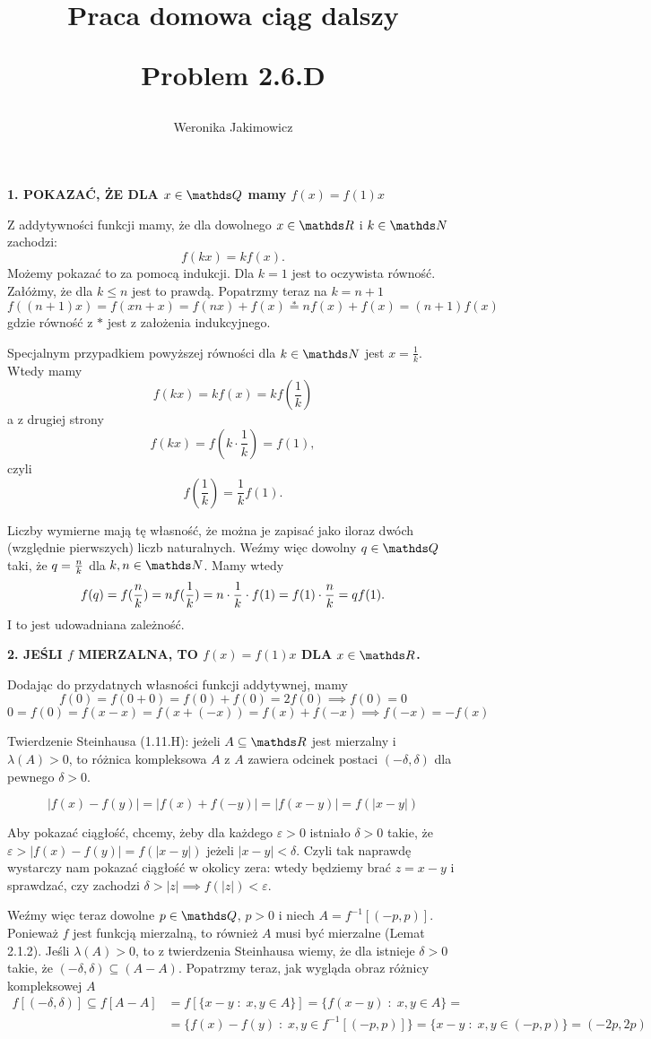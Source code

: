 \documentclass{article}
\title{Praca domowa ciąg dalszy\medskip

\large Problem \textbf{2.6.D}
}
\author{Weronika Jakimowicz}
\date{}
\begin{document}
\maketitle
\thispagestyle{empty}

\textbf{1. POKAZAĆ, ŻE DLA $x\in\Q$ mamy $f(x)=f(1)x$}
\medskip

Z addytywności funkcji mamy, że dla dowolnego $x\in\R$ i $k\in\N$ zachodzi:
$$f(kx)=kf(x).$$
Możemy pokazać to za pomocą indukcji. Dla $k=1$ jest to oczywista równość. Załóżmy, że dla $k\leq n$ jest to prawdą. Popatrzmy teraz na $k=n+1$
$$f((n+1)x)=f(xn+x)=f(nx)+f(x)\overset{*}{=}nf(x)+f(x)=(n+1)f(x)$$
gdzie równość z $*$ jest z założenia indukcyjnego.
\medskip

Specjalnym przypadkiem powyższej równości dla $k\in\N$ jest $x=\frac1k$. Wtedy mamy
$$f(kx)=kf(x)=kf(\frac1k)$$
a z drugiej strony
$$f(kx)=f(k\cdot\frac1k)=f(1),$$
czyli
$$f(\frac1k)=\frac1k f(1).$$

Liczby wymierne mają tę własność, że można je zapisać jako iloraz dwóch (względnie pierwszych) liczb naturalnych. Weźmy więc dowolny $q\in\Q$ taki, że $q={n\over k}$ dla $k,n\in\N$. Mamy wtedy
$$f(q)=f(\frac nk)=nf(\frac1k)=n\cdot\frac1k \cdot f(1)=f(1)\cdot{n\over k}=qf(1).$$
I to jest udowadniana zależność.
\bigskip

\textbf{2. JEŚLI $f$ MIERZALNA, TO $f(x)=f(1)x$ DLA $x\in\R$.}
\medskip

Dodając do przydatnych własności funkcji addytywnej, mamy
$$f(0)=f(0+0)=f(0)+f(0)=2f(0)\implies f(0)=0$$
$$0=f(0)=f(x-x)=f(x+(-x))=f(x)+f(-x)\implies f(-x)=-f(x)$$

Twierdzenie Steinhausa (1.11.H): jeżeli $A\subseteq\R$ jest mierzalny i $\lambda(A)>0$, to różnica kompleksowa $A$ z $A$ zawiera odcinek postaci $(-\delta,\delta)$ dla pewnego $\delta>0$.
\smallskip

$$|f(x)-f(y)|=|f(x)+f(-y)|=|f(x-y)|=f(|x-y|)$$

Aby pokazać ciągłość, chcemy, żeby dla każdego $\varepsilon>0$ istniało $\delta>0$ takie, że $\varepsilon>|f(x)-f(y)|=f(|x-y|)$ jeżeli $|x-y|<\delta$. Czyli tak naprawdę wystarczy nam pokazać ciągłość w okolicy zera: wtedy będziemy brać $z=x-y$ i sprawdzać, czy zachodzi $\delta>|z|\implies f(|z|)<\varepsilon$.
\medskip

Weźmy więc teraz dowolne $p\in\Q$, $p>0$ i niech $A=f^{-1}[(-p,p)]$. Ponieważ $f$ jest funkcją mierzalną, to również $A$ musi być mierzalne (Lemat 2.1.2). Jeśli $\lambda(A)>0$, to z twierdzenia Steinhausa wiemy, że dla istnieje $\delta>0$ takie, że $(-\delta,\delta)\subseteq (A-A)$. Popatrzmy teraz, jak wygląda obraz różnicy kompleksowej $A$
\begin{align*}
    f[(-\delta,\delta)]\subseteq f[A-A]&=f[\{x-y\;:\;x,y\in A\}]=\{f(x-y)\;:\;x,y\in A\}=\\
    &=\{f(x)-f(y)\;:\;x,y\in f^{-1}[(-p,p)]\}=\{x-y\;:\;x,y\in(-p,p)\}=(-2p,2p)
\end{align*}
\end{document}
